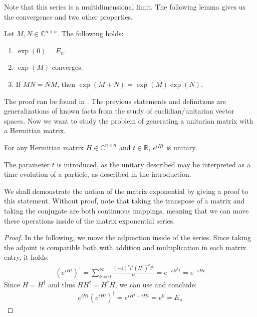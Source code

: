 Note that this series is a multidimensional limit. The following lemma gives us the convergence and two other properties.

\begin{lemma} \label{matrix_exponential_properties}
    Let \(M, N \in \mathbb{C}^{n \times n}\). The following holds:
    \begin{enumerate}[label=(\roman*)]
        \item \(\exp(0) = E_n\).
        \item \(\exp(M)\) converges.
        \item If \(MN=NM\), then \(\exp(M+N)=\exp(M)\exp(N)\).
    \end{enumerate}
\end{lemma}

The proof can be found in \cite[p. 9]{Waldmann2022}. The previous statements and definitions are generalizations of known facts from the study of euclidian/unitarian vector spaces. Now we want to study the problem of generating a unitarian matrix with a Hermitian matrix.

\begin{theorem} \label{exponential_of_hermitian_is_unitary}
    For any Hermitian matrix \(H \in \mathbb{C}^{n \times n}\) and \(t \in \mathbb{R}\), \(e^{iHt}\) is unitary.
\end{theorem}

\begin{remark}
    The parameter \(t\) is introduced, as the unitary described may be interpreted as a time evolution of a particle, as described in the introduction.
\end{remark}

We shall demonstrate the notion of the matrix exponential by giving a proof to this statement. Without proof, note that taking the transpose of a matrix and taking the conjugate are both continuous mappings, meaning that we can move these operations inside of the matrix exponential series.

\begin{proof}
    In the following, we move the adjunction inside of the series. Since taking the adjoint is compatible both with addition and multiplication in each matrix entry, it holds:
    \begin{align}
        \left(e^{iHt}\right)^\dagger = \sum_{k=0}^\infty \frac{(-1)^ki^k(H^\dagger)^kt^k}{k!} = e^{-i H^\dagger t} = e^{-i H t}
    \end{align}
    Since \(H = H^\dagger\) and thus \(H H^\dagger = H^\dagger H\), we can use  and conclude:
    \begin{align}
        e^{iHt}\left(e^{iHt}\right)^\dagger = e^{iHt-iHt} = e^0 = E_n
    \end{align}
\end{proof}

